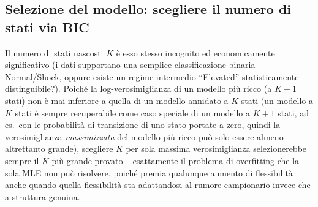 \documentclass[11pt]{article}
\theoremstyle{definition}
\theoremstyle{remark}
\begin{document}
\subsection{Selezione del modello: scegliere il numero di stati via BIC}
\label{sec:bic}

Il numero di stati nascosti $K$ \`e esso stesso incognito ed economicamente significativo (i dati supportano una semplice classificazione binaria Normal/Shock, oppure esiste un regime intermedio ``Elevated'' statisticamente distinguibile?). Poich\'e la log-verosimiglianza di un modello pi\`u ricco (a $K+1$ stati) non \`e mai inferiore a quella di un modello annidato a $K$ stati (un modello a $K$ stati \`e sempre recuperabile come caso speciale di un modello a $K+1$ stati, ad es.\ con le probabilit\`a di transizione di uno stato portate a zero, quindi la verosimiglianza \emph{massimizzata} del modello pi\`u ricco pu\`o solo essere almeno altrettanto grande), scegliere $K$ per sola massima verosimiglianza selezionerebbe sempre il $K$ pi\`u grande provato -- esattamente il problema di overfitting che la sola MLE non pu\`o risolvere, poich\'e premia qualunque aumento di flessibilit\`a anche quando quella flessibilit\`a sta adattandosi al rumore campionario invece che a struttura genuina.
\end{document}
